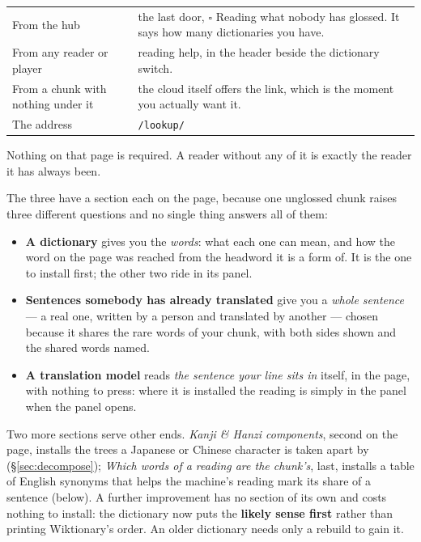 \documentclass[11pt,oneside]{report}
\newcommand{\menu}[1]{\textsf{#1}}
\begin{document}
\begin{center}
\begin{tabular}{@{}>{\raggedright\arraybackslash}p{}>{\raggedright\arraybackslash}p{}@{}}
\toprule
\textsf{From the hub} & the last door, \menu{$\square$ Reading what nobody has
  glossed}. It says how many dictionaries you have. \\
\addlinespace
\textsf{From any reader or player} & \menu{reading help}, in the header
  beside the \menu{dictionary} switch. \\
\addlinespace
\textsf{From a chunk with nothing under it} & the cloud itself offers the
  link, which is the moment you actually want it. \\
\addlinespace
\textsf{The address} & \texttt{/lookup/} \\
\bottomrule
\end{tabular}
\end{center}

\noindent Nothing on that page is required. A reader without any of it is
exactly the reader it has always been.

The three have a section each on the page, because one unglossed chunk
raises three different questions and no single thing answers all of them:

\begin{itemize}
\item \textbf{A dictionary} gives you the \emph{words}: what each one can
  mean, and how the word on the page was reached from the headword it is a
  form of. It is the one to install first; the other two ride in its panel.
\item \textbf{Sentences somebody has already translated} give you a
  \emph{whole sentence} --- a real one, written by a person and translated by
  another --- chosen because it shares the rare words of your chunk, with both
  sides shown and the shared words named.
\item \textbf{A translation model} reads \emph{the sentence your line sits
  in} itself, in the page, with nothing to press: where it is installed the
  reading is simply in the panel when the panel opens.
\end{itemize}

\noindent Two more sections serve other ends. \emph{Kanji \& Hanzi
components}, second on the page, installs the trees a Japanese or Chinese
character is taken apart by (\S\ref{sec:decompose}); \emph{Which words of a
reading are the chunk's}, last, installs a table of English synonyms that
helps the machine's reading mark its share of a sentence (below). A further
improvement has no section of its own and costs nothing to
install: the dictionary now puts the \textbf{likely sense first} rather than
printing Wiktionary's order. An older dictionary needs only a \menu{rebuild}
to gain it.
\end{document}
